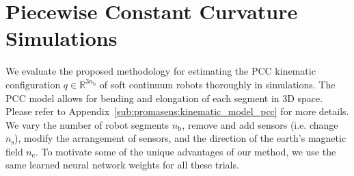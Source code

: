 \section{Piecewise Constant Curvature Simulations}\label{sec:promasens:pcc_simulations}
We evaluate the proposed methodology for estimating the \gls{PCC} kinematic configuration $q \in \mathbb{R}^{3n_\mathrm{b}}$ of soft continuum robots thoroughly in simulations.
The PCC model allows for bending and elongation of each segment in 3D space. Please refer to Appendix~\ref{sub:promasens:kinematic_model_pcc} for more details.
We vary the number of robot segments $n_\mathrm{b}$, remove and add sensors (i.e. change $n_\mathrm{s}$), modify the arrangement of sensors, and the direction of the earth's magnetic field $n_\mathrm{e}$. 
To motivate some of the unique advantages of our method, we use the same learned neural network weights for all these trials.

